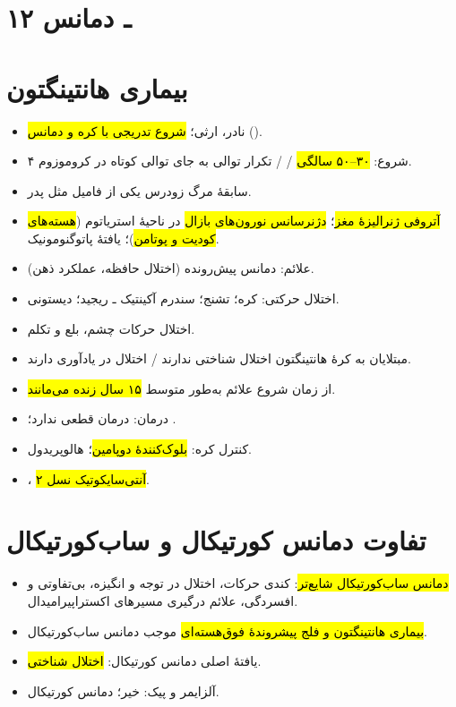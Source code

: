 \section*{۱۲ ـ دمانس}
\section{بیماری هانتینگتون}
\begin{itemize}
\item نادر، ارثی؛ \hl{شروع تدریجی با کره و دمانس} ().
\item شروع: \hl{۳۰–۵۰ سالگی} / \hl{} / تکرار توالی  به جای توالی کوتاه در کروموزوم ۴.
\item سابقهٔ مرگ زودرس یکی از فامیل مثل پدر.
\item \hl{آتروفی ژنرالیزهٔ مغز}؛ \hl{دژنرسانس نورون‌های بازال} در ناحیهٔ استریاتوم (\hl{هسته‌های کودیت و پوتامن})؛ یافتهٔ پاتوگنومونیک.
\item علائم: دمانس پیش‌رونده (اختلال حافظه، عملکرد ذهن).
\item اختلال حرکتی: کره؛ تشنج؛ سندرم آکینتیک ـ ریجید؛ دیستونی.
\item اختلال حرکات چشم، بلع و تکلم.
\item مبتلایان به کرهٔ هانتینگتون اختلال شناختی ندارند / اختلال در یادآوری دارند.
\item از زمان شروع علائم به‌طور متوسط \hl{۱۵ سال زنده می‌مانند}.
\item درمان: درمان قطعی ندارد؛ .
\item کنترل کره: \hl{بلوک‌کنندهٔ دوپامین}؛ هالوپریدول.
\item \hl{}، \hl{آنتی‌سایکوتیک نسل ۲}.
\end{itemize}
\section{تفاوت دمانس کورتیکال و ساب‌کورتیکال}
\begin{itemize}
\item \hl{دمانس ساب‌کورتیکال شایع‌تر}: کندی حرکات، اختلال در توجه و انگیزه، بی‌تفاوتی و افسردگی، علائم درگیری مسیرهای اکستراپیرامیدال.
\item \hl{بیماری هانتینگتون و فلج پیشروندهٔ فوق‌هسته‌ای} موجب دمانس ساب‌کورتیکال.
\item یافتهٔ اصلی دمانس کورتیکال: \hl{اختلال شناختی}.
\item آلزایمر و پیک: خیر؛ دمانس کورتیکال.
\end{itemize}

